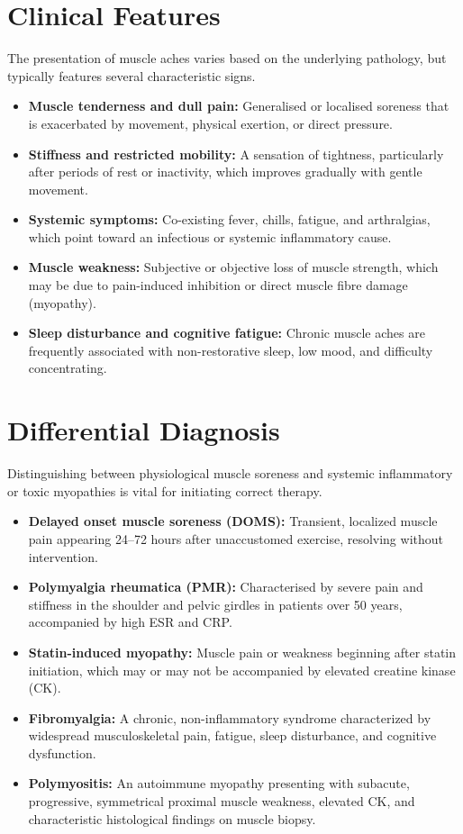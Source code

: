 \section*{Clinical Features}
The presentation of muscle aches varies based on the underlying pathology, but typically features several characteristic signs.
\begin{itemize}
    \item \textbf{Muscle tenderness and dull pain:} Generalised or localised soreness that is exacerbated by movement, physical exertion, or direct pressure.
    \item \textbf{Stiffness and restricted mobility:} A sensation of tightness, particularly after periods of rest or inactivity, which improves gradually with gentle movement.
    \item \textbf{Systemic symptoms:} Co-existing fever, chills, fatigue, and arthralgias, which point toward an infectious or systemic inflammatory cause.
    \item \textbf{Muscle weakness:} Subjective or objective loss of muscle strength, which may be due to pain-induced inhibition or direct muscle fibre damage (myopathy).
    \item \textbf{Sleep disturbance and cognitive fatigue:} Chronic muscle aches are frequently associated with non-restorative sleep, low mood, and difficulty concentrating.
\end{itemize}

\section*{Differential Diagnosis}
Distinguishing between physiological muscle soreness and systemic inflammatory or toxic myopathies is vital for initiating correct therapy.
\begin{itemize}
    \item \textbf{Delayed onset muscle soreness (DOMS):} Transient, localized muscle pain appearing 24--72 hours after unaccustomed exercise, resolving without intervention.
    \item \textbf{Polymyalgia rheumatica (PMR):} Characterised by severe pain and stiffness in the shoulder and pelvic girdles in patients over 50 years, accompanied by high ESR and CRP.
    \item \textbf{Statin-induced myopathy:} Muscle pain or weakness beginning after statin initiation, which may or may not be accompanied by elevated creatine kinase (CK).
    \item \textbf{Fibromyalgia:} A chronic, non-inflammatory syndrome characterized by widespread musculoskeletal pain, fatigue, sleep disturbance, and cognitive dysfunction.
    \item \textbf{Polymyositis:} An autoimmune myopathy presenting with subacute, progressive, symmetrical proximal muscle weakness, elevated CK, and characteristic histological findings on muscle biopsy.
\end{itemize}

